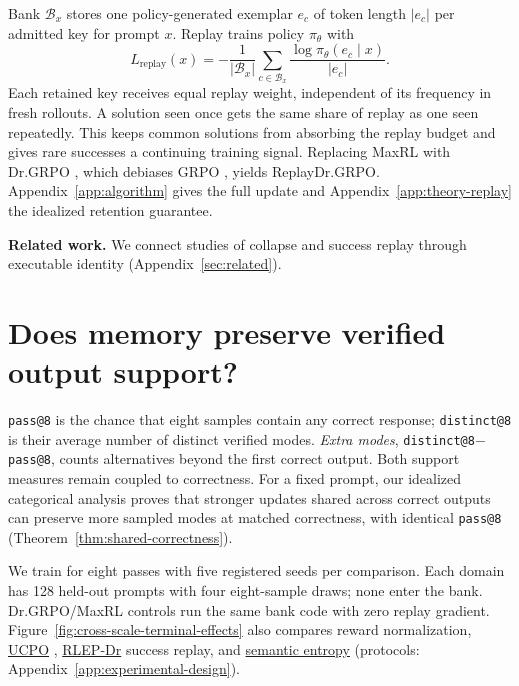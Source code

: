 Bank $\mathcal B_x$ stores one policy-generated exemplar $e_c$ of token length
$|e_c|$ per admitted key for prompt $x$. Replay trains policy $\pi_\theta$ with
\begin{equation}
L_{\mathrm{replay}}(x)=-\frac{1}{|\mathcal B_x|}
\sum_{c\in\mathcal B_x}\frac{\log\pi_\theta(e_c\mid x)}{|e_c|}.
\label{eq:lm-verified-replay}
\end{equation}
Each retained key receives equal replay weight, independent of its frequency in
fresh rollouts. A solution seen once gets the same share of replay as one seen
repeatedly. This keeps common solutions from absorbing the replay budget and
gives rare successes a continuing training signal.
Replacing MaxRL with Dr.GRPO \citep{liu2025understanding},
which debiases GRPO \citep{shao2024deepseekmath}, yields ReplayDr.GRPO.
Appendix~\ref{app:algorithm} gives the full update and
Appendix~\ref{app:theory-replay} the idealized retention guarantee.

\noindent\textbf{Related work.} We connect studies of collapse
\citep{cui2025entropy,dang2025diversity} and success replay \citep{zhang2025rlep}
through executable identity (Appendix~\ref{sec:related}).

\section{Does memory preserve verified output support?}
\label{sec:experiments}\label{sec:results}
\texttt{pass@8} is the chance that eight samples contain any correct response;
\texttt{distinct@8} is their average number of distinct verified modes.
\emph{Extra modes}, \texttt{distinct@8}$-$\texttt{pass@8}, counts alternatives
beyond the first correct output. Both support measures remain coupled to correctness.
For a fixed prompt, our idealized categorical analysis proves that stronger
updates shared across correct outputs can preserve more sampled modes at matched correctness,
with identical \texttt{pass@8} (Theorem~\ref{thm:shared-correctness}).

We train for eight passes with five registered seeds per comparison. Each domain
has 128 held-out prompts with four eight-sample draws; none enter the bank.
Dr.GRPO/MaxRL controls run the same bank code with zero replay gradient.
Figure~\ref{fig:cross-scale-terminal-effects} also compares reward normalization,
\href{https://huggingface.co/od2961/maxent-grpo-models/blob/main/EXPERIMENTS.md\#direct-comparators}{UCPO} \citep{lochab2026ucpo}, \href{https://huggingface.co/od2961/maxent-grpo-models/blob/main/EXPERIMENTS.md\#direct-comparators}{RLEP-Dr} success replay, and \href{https://huggingface.co/od2961/maxent-grpo-models/blob/main/EXPERIMENTS.md\#semantic-ablations}{semantic entropy}
(protocols: Appendix~\ref{app:experimental-design}).


